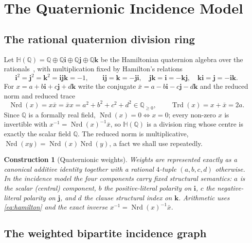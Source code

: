 \documentclass[pdflatex,sn-mathphys-num]{sn-jnl}
\theoremstyle{thmstyleone}%
\newtheorem{construction}[theorem]{Construction}%
\theoremstyle{thmstyletwo}%
\theoremstyle{thmstylethree}%
\newcommand{\HH}{\mathbb{H}}
\newcommand{\QQ}{\mathbb{Q}}
\newcommand{\Nrd}{\operatorname{Nrd}}
\newcommand{\Trd}{\operatorname{Trd}}
\newcommand{\bi}{\mathbf{i}}
\newcommand{\bj}{\mathbf{j}}
\newcommand{\bk}{\mathbf{k}}
\begin{document}
\newpage

\section{The Quaternionic Incidence Model}\label{sec:incidence}

\subsection{The rational quaternion division ring}

Let $\HH(\QQ)=\QQ\oplus\QQ\bi\oplus\QQ\bj\oplus\QQ\bk$ be the Hamiltonian
quaternion algebra over the rationals~\cite{Voight}, with multiplication
fixed by Hamilton's relations
\begin{equation}\label{eq:hamilton}
  \bi^{2}=\bj^{2}=\bk^{2}=\bi\bj\bk=-1,\qquad
  \bi\bj=\bk=-\bj\bi,\quad \bj\bk=\bi=-\bk\bj,\quad \bk\bi=\bj=-\bi\bk.
\end{equation}
For $x=a+b\bi+c\bj+d\bk$ write the conjugate $\bar x=a-b\bi-c\bj-d\bk$ and
the reduced norm and reduced trace
\begin{equation}\label{eq:normtrace}
  \Nrd(x)=x\bar x=\bar x x=a^{2}+b^{2}+c^{2}+d^{2}\in\QQ_{\ge0},
  \qquad \Trd(x)=x+\bar x=2a.
\end{equation}
Since $\QQ$ is a formally real field, $\Nrd(x)=0\iff x=0$; every non-zero
$x$ is invertible with $x^{-1}=\Nrd(x)^{-1}\bar x$, so $\HH(\QQ)$ is a
division ring whose centre is exactly the scalar field $\QQ$. The reduced
norm is multiplicative, $\Nrd(xy)=\Nrd(x)\Nrd(y)$, a fact we shall use
repeatedly.

\begin{construction}[Quaternionic weights]\label{con:weights}
Weights are represented exactly as a canonical additive identity together
with a rational $4$-tuple $(a,b,c,d)$ otherwise. In the incidence model the
four components carry fixed structural semantics: $a$ is the scalar
(central) component, $b$ the positive-literal polarity on $\bi$, $c$ the
negative-literal polarity on $\bj$, and $d$ the clause structural index on
$\bk$. Arithmetic uses \eqref{eq:hamilton} and the exact inverse
$x^{-1}=\Nrd(x)^{-1}\bar x$.
\end{construction}

\subsection{The weighted bipartite incidence graph}
\end{document}
